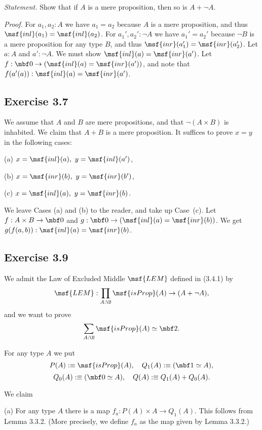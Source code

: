 \documentclass[12pt]{article}
\begin{document}
\emph{Statement.} Show that if $A$ is a mere proposition, then so is $A+\neg A$.

\nn\emph{Proof.} For $a_1,a_2:A$ we have $a_1=a_2$ because $A$ is a mere proposition, and thus $\msf{inl}(a_1)=\msf{inl}(a_2)$. For $a_1',a_2':\neg A$ we have $a_1'=a_2'$ because $\neg B$ is a mere proposition for any type $B$, and thus $\msf{inr}(a_1')=\msf{inr}(a_2')$. Let $a:A$ and $a':\neg A$. We must show $\msf{inl}(a)=\msf{inr}(a')$. Let $f:\mbf0\to(\msf{inl}(a)=\msf{inr}(a'))$, and note that $f(a'(a)):\msf{inl}(a)=\msf{inr}(a')$.


\subsection{Exercise 3.7}

We assume that $A$ and $B$ are mere propositions, and that $\neg(A\times B)$ is inhabited. We claim that $A+B$ is a mere proposition. It suffices to prove $x=y$ in the following cases:

(a) $x=\msf{inl}(a),\ y=\msf{inl}(a')$,

(b) $x=\msf{inr}(b),\ y=\msf{inr}(b')$,

(c) $x=\msf{inl}(a),\ y=\msf{inr}(b)$.

\nn We leave Cases (a) and (b) to the reader, and take up Case~(c). Let $f:A\times B\to\mbf0$ and $g:\mbf0\to(\msf{inl}(a)=\msf{inr}(b))$. We get $g(f(a,b)):\msf{inl}(a)=\msf{inr}(b)$.


\subsection{Exercise 3.9}

We admit the Law of Excluded Middle $\msf{LEM}$ defined in (3.4.1) by 
$$
\msf{LEM}:\prod_{A:\U}\msf{isProp}(A)\to(A+\neg A),
$$ 
and we want to prove 
\begin{equation}\label{e39}
\sum_{A:\U}\msf{isProp}(A)\simeq\mbf2.
\end{equation}

For any type $A$ we put 
$$
P(A):\equiv\msf{isProp}(A),\quad Q_1(A):\equiv(\mbf1\simeq A),
$$
$$
Q_0(A):\equiv(\mbf0\simeq A),\quad Q(A):\equiv Q_1(A)+Q_0(A).
$$ 

We claim

\nn(a) For any type $A$ there is a map $f_a:P(A)\times A\to Q_1(A)$. This follows from Lemma 3.3.2. (More precisely, we define $f_a$ as the map given by Lemma 3.3.2.)
\end{document}
